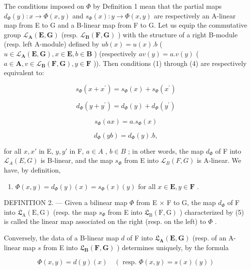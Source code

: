 The conditions imposed on \(\Phi\) by Definition 1 mean that the partial maps \(d_{\Phi}(y): x \to \Phi(x, y)\) and \(s_{\Phi}(x): y \to \Phi(x, y)\) are respectively an A-linear map from E to G and a B-linear map from F to G. Let us equip the commutative group \(\mathcal{L}_{\mathbf{A}}(\mathbf{E}, \mathbf{G})\) (resp. \(\mathcal{L}_{\mathbf{B}}(\mathbf{F}, \mathbf{G})\) ) with the structure of a right B-module (resp. left A-module) defined by \(ub(x) = u(x). b\) ( \(u \in \mathcal{L}_{\mathbf{A}}(\mathbf{E}, \mathbf{G}), x \in \mathbf{E}, b \in \mathbf{B}\) ) (respectively \(av(y) = a. v(y)\) ( \(a \in \mathbf{A}, v \in \mathcal{L}_{\mathbf{B}}(\mathbf{F}, \mathbf{G}), y \in \mathbf{F}\) )). Then conditions (1) through (4) are respectively equivalent to:

\[
s _ {\Phi} (x + x ^ {\prime}) = s _ {\Phi} (x) + s _ {\Phi} (x ^ {\prime})\tag{1'}
\]

\[
d _ {\Phi} (y + y ^ {\prime}) = d _ {\Phi} (y) + d _ {\Phi} (y ^ {\prime})\tag{2'}
\]

\[
s _ {\Phi} (a x) = a. s _ {\Phi} (x)\tag{3'}
\]

\[
d _ {\Phi} (y b) = d _ {\Phi} (y). b,\tag{4'}
\]

for all \(x, x'\) in E, \(y, y'\) in F, \(a \in A\) , \(b \in B\) ; in other words, the map \(d_{\Phi}\) of F into \(\mathcal{L}_{A}(E, G)\) is B-linear, and the map \(s_{\Phi}\) from E into \(\mathcal{L}_{B}(F, G)\) is A-linear. We have, by definition,

\begin{enumerate}
\def\labelenumi{(\arabic{enumi})}
\setcounter{enumi}{4}
\tightlist
\item
  \(\Phi(x, y) = d_{\Phi}(y)(x) = s_{\Phi}(x)(y)\) for all \(x \in \mathbf{E}, y \in \mathbf{F}\) .
\end{enumerate}

DEFINITION 2. --- Given a bilinear map \(\Phi\) from E × F to G, the map \(d_{\Phi}\) of F into \(\mathfrak{L}_{\mathrm{A}}(\mathrm{E}, \mathrm{G})\) (resp. the map \(s_{\Phi}\) from E into \(\mathfrak{L}_{\mathrm{B}}(\mathrm{F}, \mathrm{G})\) ) characterized by (5) is called the linear map associated on the right (resp. on the left) to \(\Phi\) .

Conversely, the data of a B-linear map \(d\) of F into \(\mathfrak{L}_{\mathbf{A}}(\mathbf{E},\mathbf{G})\) (resp. of an A-linear map \(s\) from E into \(\mathfrak{L}_{\mathbf{B}}(\mathbf{F},\mathbf{G})\) ) determines uniquely, by the formula

\[
\Phi (x, y) = d (y) (x) \quad (\text { resp. } \Phi (x, y) = s (x) (y))
\]

